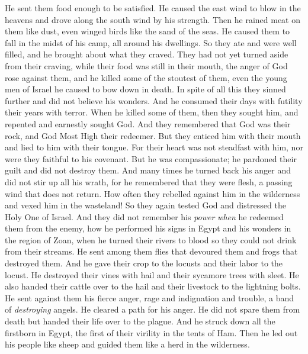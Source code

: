 \begin{biblechapter}
He sent them food enough to be satisfied.
\verse He caused the east wind to blow in the heavens 
and drove along the south wind by his strength.
\verse Then he rained meat on them like dust, 
even winged birds like the sand of the seas.
\verse He caused them to fall in the midst of his camp, 
all around his dwellings.
\verse So they ate and were well filled, 
and he brought about what they craved.
\verse They had not yet turned aside from their craving, 
while their food was still in their mouth,
\verse the anger of God rose against them, 
and he killed some of the stoutest of them, 
even the young men of Israel he caused to bow down in death.
\verse In spite of all this they sinned further 
and did not believe his wonders.
\verse And he consumed their days with futility  
their years with terror.
\verse When he killed some of them, then they sought him, 
and repented and earnestly sought God.
\verse And they remembered that God was their rock, 
and God Most High their redeemer.
\verse But they enticed him with their mouth 
and lied to him with their tongue.
\verse For their heart was not steadfast with him, 
nor were they faithful to his covenant.
\verse But he was compassionate; he pardoned their guilt 
and did not destroy them. 
And many times he turned back his anger 
and did not stir up all his wrath,
\verse for he remembered that they were flesh, 
a passing wind that does not return.
\verse How often they rebelled against him in the wilderness 
and vexed him in the wasteland!
\verse So they again tested God 
and distressed the Holy One of Israel.
\verse And they did not remember his \textit{power} 
\textit{when} he redeemed them from the enemy,
\verse how he performed his signs in Egypt 
and his wonders in the region of Zoan,
\verse when he turned their rivers to blood 
so they could not drink from their streams.
\verse He sent among them flies that devoured them 
and frogs that destroyed them.
\verse And he gave their crop to the locusts 
and their labor to the locust.
\verse He destroyed their vines with hail 
and their sycamore trees with sleet.
\verse He also handed their cattle over to the hail 
and their livestock to the lightning bolts.
\verse He sent against them his fierce anger, 
rage and indignation and trouble, 
a band of \textit{destroying} angels.
\verse He cleared a path for his anger. 
He did not spare them from death 
but handed their life over to the plague.
\verse And he struck down all the firstborn in Egypt, 
the first of their virility in the tents of Ham.
\verse Then he led out his people like sheep 
and guided them like a herd in the wilderness.

\end{biblechapter}
